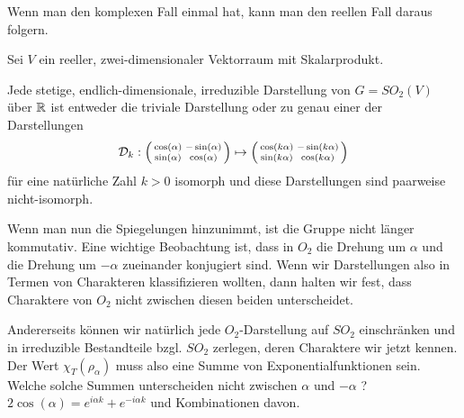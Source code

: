 \begin{remark}
Wenn man den komplexen Fall einmal hat, kann man den reellen Fall daraus folgern.
\end{remark}

\begin{corollary}[Darstellungstheorie von $SO_2$ über $\IK=\IR$]
Sei $V$ ein reeller, zwei-dimensionaler Vektorraum mit Skalarprodukt.

Jede stetige, endlich-dimensionale, irreduzible Darstellung von $G=SO_2(V)$ über $\mathbb{R}$ ist entweder die triviale Darstellung oder zu genau einer der Darstellungen
\[\mathcal{D}_k : \begin{psmallmatrix}\cos(\alpha)&-\sin(\alpha)\\\sin(\alpha)&\cos(\alpha)\end{psmallmatrix} \mapsto \begin{psmallmatrix}\cos(k\alpha)&-\sin(k\alpha)\\\sin(k\alpha)&\cos(k\alpha)\end{psmallmatrix}\]
für eine natürliche Zahl $k>0$ isomorph und diese Darstellungen sind paarweise nicht-isomorph.
\end{corollary}

\begin{remark}
Wenn man nun die Spiegelungen hinzunimmt, ist die Gruppe nicht länger kommutativ. Eine wichtige Beobachtung ist, dass in $O_2$ die Drehung um $\alpha$ und die Drehung um $-\alpha$ zueinander konjugiert sind. Wenn wir Darstellungen also in Termen von Charakteren klassifizieren wollten, dann halten wir fest, dass Charaktere von $O_2$ nicht zwischen diesen beiden unterscheidet.

Andererseits können wir natürlich jede $O_2$-Darstellung auf $SO_2$ einschränken und in irreduzible Bestandteile bzgl. $SO_2$ zerlegen, deren Charaktere wir jetzt kennen. Der Wert $\chi_T(\rho_\alpha)$ muss also eine Summe von Exponentialfunktionen sein. Welche solche Summen unterscheiden nicht zwischen $\alpha$ und $-\alpha$ ? $2\cos(\alpha) = e^{i\alpha k} + e^{-i\alpha k}$ und Kombinationen davon.
\end{remark}

